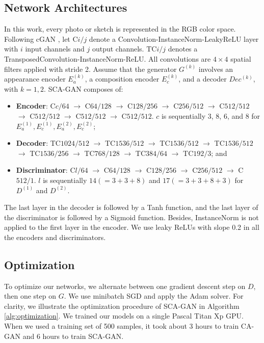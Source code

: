 \documentclass[journal]{IEEEtran}
\begin{document}
\subsection{Network Architectures}
\label{ssec:netarc}

In this work, every photo or sketch is represented in the RGB color space. Following cGAN \cite{Isola2017Pix2Pix}, let $\mathrm{C}i/j$ denote a Convolution-InstanceNorm-LeakyReLU layer with $i$ input channels and $j$ output channels. $\mathrm{TC}i/j$ denotes a TransposedConvolution-InstanceNorm-ReLU. All convolutions are $4\times 4$ spatial filters applied with stride 2. Assume that the generator $G^{(k)}$ involves an appearance encoder $E^{(k)}_{a}$, a composition encoder $E^{(k)}_{c}$, and a decoder $Dec^{(k)}$, with $k=1,2$.
SCA-GAN composes of: 
\begin{itemize}
\item \textbf{Encoder}: C$c/64$ $\rightarrow$ C$64/128$ $\rightarrow$ C$128/256$ $\rightarrow$ C$256/512$ $\rightarrow$ C$512/512$ $\rightarrow$ C$512/512$ $\rightarrow$ C$512/512$ $\rightarrow$ C$512/512$. $c$ is sequentially $3$, $8$, $6$, and $8$ for $E^{(1)}_{a}, E^{(1)}_{c}, E^{(2)}_{a}, E^{(2)}_{c}$;

\item \textbf{Decoder}: TC$1024/512$ $\rightarrow$ TC$1536/512$ $\rightarrow$ TC$1536/512$ $\rightarrow$ TC$1536/512$ $\rightarrow$ TC$1536/256$ $\rightarrow$ TC$768/128$ $\rightarrow$ TC$384/64$ $\rightarrow$ TC$192/3$; and


\item \textbf{Discriminator}: C$l/64$ $\rightarrow$ C$64/128$ $\rightarrow$ C$128/256$ $\rightarrow$ C$256/512$ $\rightarrow$ C$512/1$. $l$ is sequentially $14(=3+3+8)$ and $17(=3+3+8+3)$ for $D^{(1)}$ and $D^{(2)}$.
\end{itemize}
The last layer in the decoder is followed by a Tanh function, and the last layer of the discriminator is followed by a Sigmoid function. Besides, InstanceNorm is not applied to the first layer in the encoder. We use leaky ReLUs with slope 0.2 in all the encoders and discriminators. 




\subsection{Optimization}
\label{sec:optim}



To optimize our networks, we alternate between one gradient descent step on $D$, then one step on $G$. We use minibatch SGD and apply the Adam solver. For clarity, we illustrate the optimization procedure of SCA-GAN in Algorithm \ref{alg:optimization}. 
We trained our models on a single Pascal Titan Xp GPU. When we used a training set of 500 samples, it took about 3 hours to train CA-GAN and 6 hours to train SCA-GAN.
\end{document}
